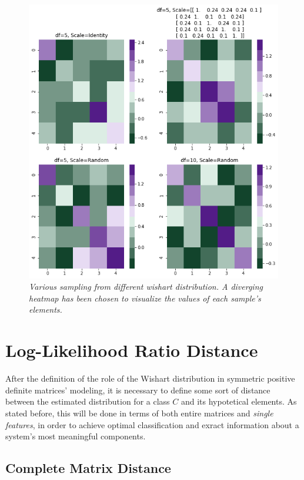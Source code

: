 \documentclass[12pt,openright,twoside,a4paper]{book}
\begin{document}
\begin{figure}[!h]
\centering
\includegraphics[scale=0.5]{randmatr}
\caption{\textit{Various sampling from different wishart distribution. A diverging heatmap has been chosen to visualize the values of each sample's elements.}}
\label{randmatr}
\end{figure}

\section{Log-Likelihood Ratio Distance}

After the definition of the role of the Wishart distribution in symmetric positive definite matrices' modeling, it is necessary to define some sort of distance between the estimated distribution for a class $C$ and its hypotetical elements.
As stated before, this will be done in terms of both entire matrices and \textit{single features}, in order to achieve optimal classification and exract information about a system's most meaningful components.

\subsection{Complete Matrix Distance}
\end{document}

